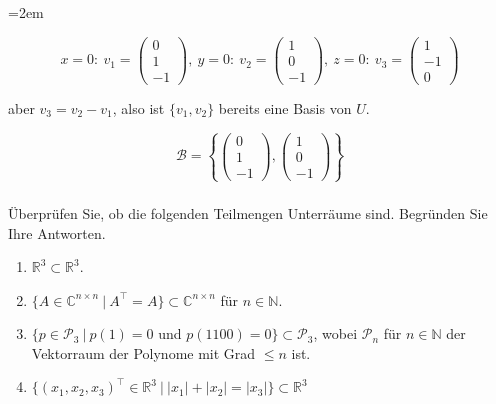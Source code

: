 \begin{solution}    

    \leftskip=2em

    \begin{equation*}
        x = 0: \ v_1 = \begin{pmatrix}
            0 \\ 1 \\ -1
        \end{pmatrix}, \ y = 0: \ v_2 = \begin{pmatrix}
            1 \\ 0 \\ -1
        \end{pmatrix}, \ z = 0: \ v_3 = \begin{pmatrix}
            1 \\ -1 \\ 0
        \end{pmatrix}
    \end{equation*}

    aber \( v_3 = v_2 - v_1 \), also ist \( \{v_1,v_2\} \) bereits eine Basis von \( U \).

    \begin{equation*}
        \mathcal{B} = \left\{ \begin{pmatrix}
            0 \\ 1 \\ -1
        \end{pmatrix}, \begin{pmatrix}
            1 \\ 0 \\ -1
        \end{pmatrix} \right\}
    \end{equation*}

\end{solution}

\vspace{1cm}

\subsubsection{} %

Überprüfen Sie, ob die folgenden Teilmengen Unterräume sind. Begründen Sie Ihre Antworten.
\begin{enumerate}[label=\alph*)]
    \item \( \mathbb{R}^3 \subset \mathbb{R}^3\).
    \item \( \{A\in \mathbb{C}^{n \times n}\: |\: A^\top = A \} \subset \mathbb{C}^{n \times n} \) für \( n \in \mathbb{N} \).
    \item  \( \{p \in \mathcal{P}_3\: |\: p(1) = 0 \) und  \( p(1100)=0\} \subset \mathcal{P}_3 \), wobei  \( \mathcal{P}_n \) für \( n \in \mathbb{N} \) der Vektorraum der Polynome mit Grad \( \leq n \) ist.
    \item \( \{(x_1, x_2, x_3)^\top \in \mathbb{R}^3 \: |\: \lvert x_1\rvert+\lvert x_2\rvert=\lvert x_3\rvert \}\subset \mathbb{R}^3 \)
\end{enumerate}

